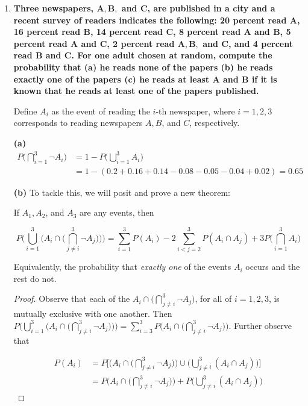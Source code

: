 \documentclass[10pt, oneside]{article}
\begin{document}
\begin{enumerate}[label=3.\arabic*]
\item  \begin{tcolorbox}[
  colback=Cerulean!5!white,
  colframe=Cerulean!75!black]
\textbf{Three newspapers, $\bm{A, B,}$ and $\bm{C}$, are published in a city and a recent survey of readers indicates the following: 20 percent read $\bm{A}$, 16 percent read $\bm{B}$, 14 percent read $\bm{C}$, 8 percent read $\bm{A}$ and $\bm{B}$, 5 percent read $\bm{A}$ and $\bm{C}$, 2 percent read $\bm{A, B,}$ and $\bm{C}$, and 4 percent read $\bm{B}$ and $\bm{C}$. For one adult chosen at random, compute the probability that (a) he reads none of the papers (b) he reads exactly one of the papers (c) he reads at least $\bm{A}$ and $\bm{B}$ if it is known that he reads at least one of the papers published.}
\end{tcolorbox}

Define $A_i$ as the event of reading the $i$-th newspaper, where $i = 1, 2, 3$ corresponds to reading newspapers $A, B$, and $C$, respectively.

\textbf{(a)} 
\begin{align*}
P\Bigg( \bigcap^3_{i = 1} \neg A_i \Bigg) &= 1 - P \Bigg( \bigcup^3_{i = 1} A_i \Bigg) \\
&= 1 - (0.2 + 0.16 + 0.14 - 0.08 - 0.05 - 0.04 + 0.02) = \boxed{0.65}
\end{align*}

\textbf{(b)} To tackle this, we will posit and prove a new theorem:

\begin{thm}If $A_1, A_2$, and $A_3$ are any events, then

\[ P \Bigg( \bigcup^3_{i=1} \bigg( A_i  \cap \Big( \bigcap^3_{j \neq i} \neg A_j \Big) \bigg) \Bigg) = \sum^3_{i = 1} P(A_i) - 2 \sum^3_{i < j = 2} P(A_i \cap A_j) + 3 P\Bigg( \bigcap^3_{i=1} A_i \Bigg) \]

Equivalently, the probability that \textit{exactly one} of the events $A_i$ occurs and the rest do not.
\end{thm}

\begin{proof}Observe that each of the $A_i  \cap \Big( \bigcap^3_{j \neq i} \neg A_j \Big)$, for all of $i = 1, 2, 3$, is mutually exclusive with one another. Then $P \Bigg( \bigcup^3_{i=1} \bigg( A_i  \cap \Big( \bigcap^3_{j \neq i} \neg A_j \Big) \bigg) \Bigg) = \sum^3_{i = 3} P \Bigg( A_i  \cap \Big( \bigcap^3_{j \neq i} \neg A_j \Big) \Bigg)$. Further observe that

\begin{align*}
P(A_i) &= P\Bigg[ \Bigg( A_i  \cap \Big( \bigcap^3_{j \neq i} \neg A_j \Big) \Bigg) \cup \Bigg( \bigcup^3_{j \neq i} (A_i \cap A_j) \Bigg) \Bigg] \\
&= P\Bigg( A_i  \cap \Big( \bigcap^3_{j \neq i} \neg A_j \Big) \Bigg) + P \Bigg( \bigcup^3_{j \neq i} (A_i \cap A_j) \Bigg) 
\end{align*}


\end{proof}
\end{enumerate}
\end{document}
